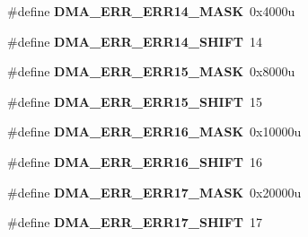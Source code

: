 \begin{DoxyCompactItemize}
\item 
\hypertarget{group___d_m_a___register___masks_ga75221d150ac8723e86b606a11d0afa4b}{}\#define {\bfseries D\+M\+A\+\_\+\+E\+R\+R\+\_\+\+E\+R\+R14\+\_\+\+M\+A\+S\+K}~0x4000u\label{group___d_m_a___register___masks_ga75221d150ac8723e86b606a11d0afa4b}

\item 
\hypertarget{group___d_m_a___register___masks_ga007cfb975ad771415fc6ff30ec5e0ff8}{}\#define {\bfseries D\+M\+A\+\_\+\+E\+R\+R\+\_\+\+E\+R\+R14\+\_\+\+S\+H\+I\+F\+T}~14\label{group___d_m_a___register___masks_ga007cfb975ad771415fc6ff30ec5e0ff8}

\item 
\hypertarget{group___d_m_a___register___masks_gaa3b260afe4db53c9e602f1f6a5201fff}{}\#define {\bfseries D\+M\+A\+\_\+\+E\+R\+R\+\_\+\+E\+R\+R15\+\_\+\+M\+A\+S\+K}~0x8000u\label{group___d_m_a___register___masks_gaa3b260afe4db53c9e602f1f6a5201fff}

\item 
\hypertarget{group___d_m_a___register___masks_ga2045ddbd1bc78466e6fa9b2ac4202ef1}{}\#define {\bfseries D\+M\+A\+\_\+\+E\+R\+R\+\_\+\+E\+R\+R15\+\_\+\+S\+H\+I\+F\+T}~15\label{group___d_m_a___register___masks_ga2045ddbd1bc78466e6fa9b2ac4202ef1}

\item 
\hypertarget{group___d_m_a___register___masks_ga4c220c5db8224c45d7653ef7380c8583}{}\#define {\bfseries D\+M\+A\+\_\+\+E\+R\+R\+\_\+\+E\+R\+R16\+\_\+\+M\+A\+S\+K}~0x10000u\label{group___d_m_a___register___masks_ga4c220c5db8224c45d7653ef7380c8583}

\item 
\hypertarget{group___d_m_a___register___masks_ga822df853837e803e3c3a3019ca29f4f4}{}\#define {\bfseries D\+M\+A\+\_\+\+E\+R\+R\+\_\+\+E\+R\+R16\+\_\+\+S\+H\+I\+F\+T}~16\label{group___d_m_a___register___masks_ga822df853837e803e3c3a3019ca29f4f4}

\item 
\hypertarget{group___d_m_a___register___masks_ga12b6026395d510077e844b30490d9c15}{}\#define {\bfseries D\+M\+A\+\_\+\+E\+R\+R\+\_\+\+E\+R\+R17\+\_\+\+M\+A\+S\+K}~0x20000u\label{group___d_m_a___register___masks_ga12b6026395d510077e844b30490d9c15}

\item 
\hypertarget{group___d_m_a___register___masks_ga73df87a11fcab5a6fa6edac52b55af01}{}\#define {\bfseries D\+M\+A\+\_\+\+E\+R\+R\+\_\+\+E\+R\+R17\+\_\+\+S\+H\+I\+F\+T}~17\label{group___d_m_a___register___masks_ga73df87a11fcab5a6fa6edac52b55af01}


\end{DoxyCompactItemize}
